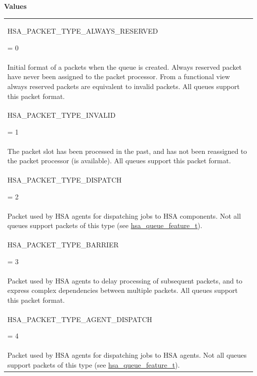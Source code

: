 \documentclass[final]{book}
\newcommand{\reftyp}[1]{#1}
\newcommand{\refenu}[1]{\reftyp{#1}}
\begin{document}
\noindent\textbf{Values}\\[-5mm]
\begin{longtable}{@{\hspace{2em}}p{\linewidth-2em}}
\hspace{-2em}\hypertarget{group__aql_1gga35a04bfe654a1c980ac904cafd6373a1a4f31bfb4b09cd05fd921b856d711f2a2}{\refenu{HSA_\-PACKET_\-TYPE_\-ALWAYS_\-RESERVED}} = 0\\Initial format of a packets when the queue is created. Always reserved packet have never been assigned to the packet processor. From a functional view always reserved packets are equivalent to invalid packets. All queues support this packet format.\\[2mm]
\hspace{-2em}\hypertarget{group__aql_1gga35a04bfe654a1c980ac904cafd6373a1a9030931b8fe80fb9add8c796cd8886c5}{\refenu{HSA_\-PACKET_\-TYPE_\-INVALID}} = 1\\The packet slot has been processed in the past, and has not been reassigned to the packet processor (is available). All queues support this packet format.\\[2mm]
\hspace{-2em}\hypertarget{group__aql_1gga35a04bfe654a1c980ac904cafd6373a1aeb97ed75df70d88767647a67265e4e59}{\refenu{HSA_\-PACKET_\-TYPE_\-DISPATCH}} = 2\\Packet used by HSA agents for dispatching jobs to HSA components. Not all queues support packets of this type (see \hyperlink{group__queue_1ga1145b01f6d9e2670179a22c92db39413}{hsa_\-queue_\-feature_\-t}).\\[2mm]
\hspace{-2em}\hypertarget{group__aql_1gga35a04bfe654a1c980ac904cafd6373a1a33877d0c8ec83f59d3a2f9d3ecbb32da}{\refenu{HSA_\-PACKET_\-TYPE_\-BARRIER}} = 3\\Packet used by HSA agents to delay processing of subsequent packets, and to express complex dependencies between multiple packets. All queues support this packet format.\\[2mm]
\hspace{-2em}\hypertarget{group__aql_1gga35a04bfe654a1c980ac904cafd6373a1aeb8ddfcceb12c29b12f52609e7bb7ce2}{\refenu{HSA_\-PACKET_\-TYPE_\-AGENT_\-DISPATCH}} = 4\\Packet used by HSA agents for dispatching jobs to HSA agents. Not all queues support packets of this type (see \hyperlink{group__queue_1ga1145b01f6d9e2670179a22c92db39413}{hsa_\-queue_\-feature_\-t}).
\end{longtable}
\end{document}
